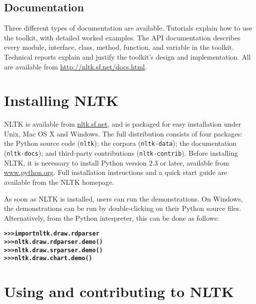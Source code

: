 \documentclass[11pt]{article}
\begin{document}
\subsection{Documentation}

Three different types of documentation are available.  Tutorials
explain how to use the toolkit, with detailed worked examples.  The
API documentation describes every module, interface, class, method,
function, and variable in the toolkit.  Technical reports explain and
justify the toolkit's design and implementation.  All are available
from \url{http://nltk.sf.net/docs.html}.

\section{Installing NLTK}

NLTK is available from \url{nltk.sf.net}, and is packaged for
easy installation under Unix, Mac OS X and Windows.  The full
distribution consists of four packages: the Python source code
(\texttt{nltk}); the corpora (\texttt{nltk-data}); the documentation
(\texttt{nltk-docs}); and third-party contributions
(\texttt{nltk-contrib}).  Before installing NLTK, it is necessary to
install Python version 2.3 or later, available from
\url{www.python.org}.  Full installation instructions and a quick
start guide are available from the NLTK homepage.

As soon as NLTK is installed, users can run the demonstrations.  On
Windows, the demonstrations can be run by double-clicking on their
Python source files.  Alternatively, from the Python interpreter, this
can be done as follows:

\begin{alltt} \small
\textbf{>>> import nltk.draw.rdparser}
\textbf{>>> nltk.draw.rdparser.demo()}
\textbf{>>> nltk.draw.srparser.demo()}
\textbf{>>> nltk.draw.chart.demo()}
\end{alltt}

\section{Using and contributing to NLTK}
\end{document}
